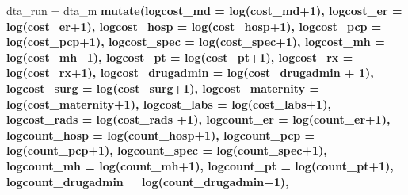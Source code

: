\documentclass[]{article}
\newenvironment{Shaded}{\begin{snugshade}}{\end{snugshade}}
\newcommand{\KeywordTok}[1]{\textcolor[rgb]{0.13,0.29,0.53}{\textbf{#1}}}
\newcommand{\DataTypeTok}[1]{\textcolor[rgb]{0.13,0.29,0.53}{#1}}
\newcommand{\DecValTok}[1]{\textcolor[rgb]{0.00,0.00,0.81}{#1}}
\newcommand{\StringTok}[1]{\textcolor[rgb]{0.31,0.60,0.02}{#1}}
\newcommand{\OperatorTok}[1]{\textcolor[rgb]{0.81,0.36,0.00}{\textbf{#1}}}
\newcommand{\NormalTok}[1]{#1}
\begin{document}
\begin{Shaded}
\begin{Highlighting}[]
\NormalTok{dta_run =}\StringTok{ }\NormalTok{dta_m }\OperatorTok{%>%}
\StringTok{  }\KeywordTok{mutate}\NormalTok{(}\DataTypeTok{logcost_md =} \KeywordTok{log}\NormalTok{(cost_md}\OperatorTok{+}\DecValTok{1}\NormalTok{),}
         \DataTypeTok{logcost_er =} \KeywordTok{log}\NormalTok{(cost_er}\OperatorTok{+}\DecValTok{1}\NormalTok{),}
         \DataTypeTok{logcost_hosp =} \KeywordTok{log}\NormalTok{(cost_hosp}\OperatorTok{+}\DecValTok{1}\NormalTok{),}
         \DataTypeTok{logcost_pcp =} \KeywordTok{log}\NormalTok{(cost_pcp}\OperatorTok{+}\DecValTok{1}\NormalTok{),}
         \DataTypeTok{logcost_spec =} \KeywordTok{log}\NormalTok{(cost_spec}\OperatorTok{+}\DecValTok{1}\NormalTok{),}
         \DataTypeTok{logcost_mh =} \KeywordTok{log}\NormalTok{(cost_mh}\OperatorTok{+}\DecValTok{1}\NormalTok{),}
         \DataTypeTok{logcost_pt =} \KeywordTok{log}\NormalTok{(cost_pt}\OperatorTok{+}\DecValTok{1}\NormalTok{),}
         \DataTypeTok{logcost_rx =} \KeywordTok{log}\NormalTok{(cost_rx}\OperatorTok{+}\DecValTok{1}\NormalTok{),}
         \DataTypeTok{logcost_drugadmin =} \KeywordTok{log}\NormalTok{(cost_drugadmin }\OperatorTok{+}\StringTok{ }\DecValTok{1}\NormalTok{),}
         \DataTypeTok{logcost_surg =} \KeywordTok{log}\NormalTok{(cost_surg}\OperatorTok{+}\DecValTok{1}\NormalTok{),}
         \DataTypeTok{logcost_maternity =} \KeywordTok{log}\NormalTok{(cost_maternity}\OperatorTok{+}\DecValTok{1}\NormalTok{),}
         \DataTypeTok{logcost_labs =} \KeywordTok{log}\NormalTok{(cost_labs}\OperatorTok{+}\DecValTok{1}\NormalTok{),}
         \DataTypeTok{logcost_rads =} \KeywordTok{log}\NormalTok{(cost_rads }\OperatorTok{+}\DecValTok{1}\NormalTok{),}
        \DataTypeTok{logcount_er =} \KeywordTok{log}\NormalTok{(count_er}\OperatorTok{+}\DecValTok{1}\NormalTok{),}
        \DataTypeTok{logcount_hosp =} \KeywordTok{log}\NormalTok{(count_hosp}\OperatorTok{+}\DecValTok{1}\NormalTok{),}
        \DataTypeTok{logcount_pcp =} \KeywordTok{log}\NormalTok{(count_pcp}\OperatorTok{+}\DecValTok{1}\NormalTok{),}
        \DataTypeTok{logcount_spec =} \KeywordTok{log}\NormalTok{(count_spec}\OperatorTok{+}\DecValTok{1}\NormalTok{),}
        \DataTypeTok{logcount_mh =} \KeywordTok{log}\NormalTok{(count_mh}\OperatorTok{+}\DecValTok{1}\NormalTok{),}
        \DataTypeTok{logcount_pt =} \KeywordTok{log}\NormalTok{(count_pt}\OperatorTok{+}\DecValTok{1}\NormalTok{),}
        \DataTypeTok{logcount_drugadmin =} \KeywordTok{log}\NormalTok{(count_drugadmin}\OperatorTok{+}\DecValTok{1}\NormalTok{),}
}
\end{Highlighting}
\end{Shaded}
\end{document}
